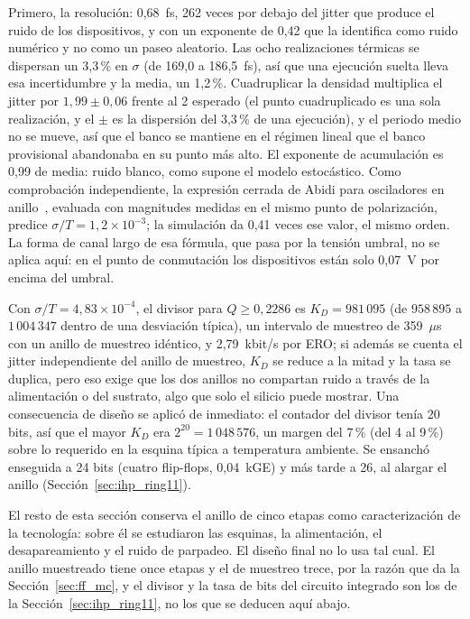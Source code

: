 Primero, la resolución: 0,68~fs, 262 veces por debajo del jitter que
produce el ruido de los dispositivos, y con un exponente de 0,42 que la
identifica como ruido numérico y no como un paseo aleatorio. Las ocho
realizaciones térmicas se dispersan un 3,3\,\% en $\sigma$ (de 169,0 a
186,5~fs), así que una ejecución suelta lleva esa incertidumbre y la media,
un 1,2\,\%. Cuadruplicar la densidad multiplica el jitter por
$1{,}99 \pm 0{,}06$ frente al 2 esperado (el punto cuadruplicado es una
sola realización, y el $\pm$ es la dispersión del 3,3\,\% de una
ejecución), y el periodo medio no se mueve,
así que el banco se mantiene en el régimen lineal que el banco provisional
abandonaba en su punto más alto. El exponente de acumulación es 0,99 de
media: ruido blanco, como supone el modelo estocástico. Como comprobación
independiente, la expresión cerrada de Abidi para osciladores en
anillo~\cite{abidi_2006_ring}, evaluada con magnitudes medidas en el
mismo punto de polarización, predice $\sigma/T = 1{,}2\times10^{-3}$; la
simulación da 0,41 veces ese valor, el mismo orden. La forma de canal
largo de esa fórmula, que pasa por la tensión umbral, no se aplica aquí:
en el punto de conmutación los dispositivos están solo 0,07~V por encima
del umbral.

Con $\sigma/T = 4{,}83\times10^{-4}$, el divisor para $Q \ge 0{,}2286$ es
$K_D = 981\,095$ (de $958\,895$ a $1\,004\,347$ dentro de una desviación
típica), un intervalo de muestreo de 359~$\mu$s con un anillo de
muestreo idéntico, y 2,79~kbit/s por \ac{ERO}; si además se cuenta el
jitter independiente del anillo de muestreo, $K_D$ se reduce a la mitad y
la tasa se duplica, pero eso exige que los dos anillos no compartan ruido
a través de la alimentación o del sustrato, algo que solo el silicio
puede mostrar. Una consecuencia de diseño se aplicó de inmediato: el
contador del divisor tenía 20 bits, así que el mayor $K_D$ era
$2^{20} = 1\,048\,576$, un margen del 7\,\% (del 4 al 9\,\%) sobre lo
requerido en la esquina típica a temperatura ambiente. Se ensanchó
enseguida a 24 bits (cuatro flip-flops, 0,04~kGE) y más tarde a 26, al
alargar el anillo (Sección~\ref{sec:ihp_ring11}).

El resto de esta sección conserva el anillo de cinco etapas como
caracterización de la tecnología: sobre él se estudiaron las esquinas, la
alimentación, el desapareamiento y el ruido de parpadeo. El diseño final
no lo usa tal cual. El anillo muestreado tiene once etapas y el de
muestreo trece, por la razón que da la Sección~\ref{sec:ff_mc}, y el
divisor y la tasa de bits del circuito integrado son los de la
Sección~\ref{sec:ihp_ring11}, no los que se deducen aquí abajo.

